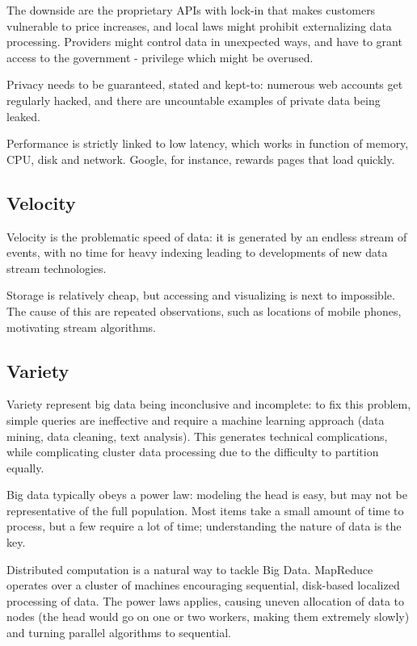 The downside are the proprietary APIs with lock-in that makes customers vulnerable to price increases, and local laws might prohibit externalizing data processing. Providers might control data in unexpected ways, and have to grant access to the government - privilege which might be overused.

Privacy needs to be guaranteed, stated and kept-to: numerous web accounts get regularly hacked, and there are uncountable examples of private data being leaked. 

Performance is strictly linked to low latency, which works in function of memory, CPU, disk and network. Google, for instance, rewards pages that load quickly. 

\subsection{Velocity}
Velocity is the problematic speed of data: it is generated by an endless stream of events, with no time for heavy indexing leading to developments of new data stream technologies. 

Storage is relatively cheap, but accessing and visualizing is next to impossible. The cause of this are repeated observations, such as locations of mobile phones, motivating stream algorithms. 

\subsection{Variety}
Variety represent big data being inconclusive and incomplete: to fix this problem, simple queries are ineffective and require a machine learning approach (data mining, data cleaning, text analysis). This generates technical complications, while complicating cluster data processing due to the difficulty to partition equally.

Big data typically obeys a power law: modeling the head is easy, but may not be representative of the full population. Most items take a small amount of time to process, but a few require a lot of time; understanding the nature of data is the key. 

Distributed computation is a natural way to tackle Big Data. MapReduce operates over a cluster of machines encouraging sequential, disk-based localized processing of data. The power laws applies, causing uneven allocation of data to nodes (the head would go on one or two workers, making them extremely slowly) and turning parallel algorithms to sequential. 

